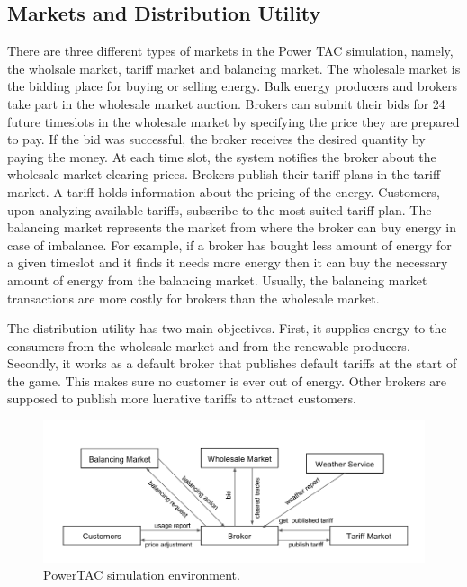 \subsection{Markets and Distribution Utility}

There are three different types of markets in the Power TAC simulation, namely, the wholsale market, tariff market and balancing market. The wholesale market is the bidding place for buying or selling energy. Bulk energy producers and brokers take part in the wholesale market auction. Brokers can submit their bids for 24 future timeslots in the wholesale market by specifying the price they are prepared to pay. If the bid was successful, the broker receives the desired quantity by paying the money. At each time slot, the system notifies the broker about the wholesale market clearing prices. Brokers publish their tariff plans in the tariff market. A tariff holds information about the pricing of the energy. Customers, upon analyzing available tariffs, subscribe to the most suited tariff plan. The balancing market represents the market from where the broker can buy energy in case of imbalance. For example, if a broker has bought less amount of energy for a given timeslot and it finds it needs more energy then it can buy the necessary amount of energy from the balancing market. Usually, the balancing market transactions are more costly for brokers than the wholesale market.

The distribution utility has two main objectives. First, it supplies energy to the consumers from the wholesale market and from the renewable producers. Secondly, it works as a default broker that publishes default tariffs at the start of the game. This makes sure no customer is ever out of energy. Other brokers are supposed to publish more lucrative tariffs to attract customers.


\begin{figure}[h]
  \includegraphics[width=\linewidth]{simulation-environment.png}
  \caption{PowerTAC simulation environment.}
  \label{fig:simulation-environment}
\end{figure}

